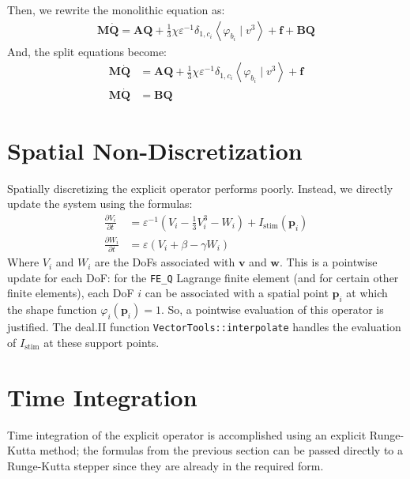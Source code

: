 \documentclass{article}
\newcommand{\bvec}[1]{\boldsymbol{#1}}
\newcommand{\bmat}[1]{\boldsymbol{#1}}
\begin{document}
\noindent Then, we rewrite the monolithic equation as:
\begin{align*}
    \bmat{M} \dot{\bvec{Q}}
        = \bmat{A} \bvec{Q}
            + \frac{1}{3} \chi \varepsilon^{-1} \delta_{1, c_i} \left< \varphi_{b_i} \mid v^3 \right>
            + \bvec{f}
            + \bmat{B} \bvec{Q}
\end{align*}
\noindent And, the split equations become:
\begin{align*}
    \bmat{M} \dot{\bvec{Q}}
        & = \bmat{A} \bvec{Q}
            + \frac{1}{3} \chi \varepsilon^{-1} \delta_{1, c_i} \left< \varphi_{b_i} \mid v^3 \right>
            + \bvec{f} \\
    \bmat{M} \dot{\bvec{Q}}
        & = \bmat{B} \bvec{Q}
\end{align*}

\newpage
\section{Spatial Non-Discretization}

Spatially discretizing the explicit operator performs poorly.
Instead, we directly update the system using the formulas:
\begin{align*}
    \frac{\partial V_i}{\partial t}
        & = \varepsilon^{-1} (V_i
                - \frac{1}{3} V_i^3
                - W_i)
            + I_\text{stim}(\bvec{p}_i) \\
    \frac{\partial W_i}{\partial t}
        & = \varepsilon (V_i
            + \beta
            - \gamma W_i)
\end{align*}
\noindent Where $V_i$ and $W_i$ are the DoFs associated with
$\bvec{v}$ and $\bvec{w}$.
This is a pointwise update for each DoF:
for the \texttt{FE\_Q} Lagrange finite element
(and for certain other finite elements),
each DoF $i$ can be associated with a spatial point $\bvec{p}_i$
at which the shape function $\varphi_i(\bvec{p}_i) = 1$.
So, a pointwise evaluation of this operator is justified.
The deal.II function \texttt{VectorTools::interpolate}
handles the evaluation of $I_\text{stim}$ at these support points.

\newpage
\section{Time Integration}

Time integration of the explicit operator is accomplished
using an explicit Runge-Kutta method;
the formulas from the previous section
can be passed directly to a Runge-Kutta stepper
since they are already in the required form.
\end{document}
